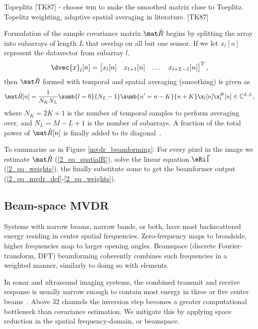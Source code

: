 {
Topeplitz [TK87] - choose wm to make the smoothed matrix close to Toeplitz. Topelitz weighting, adaptive spatial averaging in literature. [TK87]

Formulation of the sample covariance matrix $\eR$ begins by splitting the array into subarrays of length $L$ that overlap on all but one sensor. If we let $x_l[n]$ represent the datavector from subarray $l$,
%
\begin{gather}
\dvec{x}_l[n] = \bmat{x_l[n] & x_{l+1}[n] & \dots & x_{l+L-1}[n]}^T,
\end{gather}
%
then $\eR$ formed with temporal and spatial averaging (smoothing) is given as
%
\begin{gather}
\eR[n] =  \frac{1}{N_K N_L} \sumb{l=0}{N_L-1}\sumb{n'=n-K}{n+K} \x_l[n]\x_l^H[n] \in\mathbb{C}^{L,L},\label{2_eq_spatialR}
\end{gather}
%
where $N_K = 2K+1$ is the number of temporal samples to perform averaging over, and $N_L = M-L+1$ is the number of subarrays. A fraction of the total power of $\eR[n]$ is finally added to its diagonal~\cite{Synnevag2007}.

To summarize as in Figure \ref{mvdr_beamforming}: For every pixel in the image we estimate $\eR$ (\ref{2_eq_spatialR}), solve the linear equation $\eRi\1$ (\ref{2_eq_weights}), the finally substitute some to get the beamformer output (\ref{2_eq_mvdr_def}-\ref{2_eq_weights}).




\subsection{Beam-space MVDR}\label{sec_bs_mvdr}

Systems with narrow beams, narrow bands, or both, have most backscattered energy residing in center spatial frequencies. Zero-frequency maps to broadside, higher frequencies map to larger opening angles. Beamspace (discrete Fourier-transform, DFT) beamforming coherently combines such frequencies in a weighted manner, similarly to doing so with elements. 


In sonar and ultrasound imaging systems, the combined transmit and receive response is usually narrow enough to contain most energy in three or five center beams~\cite{Nilsen2009a,VanTrees2002}. Above 32 channels the inversion step becomes a greater computational bottleneck than covariance estimation. We mitigate this by applying space reduction in the spatial frequency-domain, or beamspace. 

}
